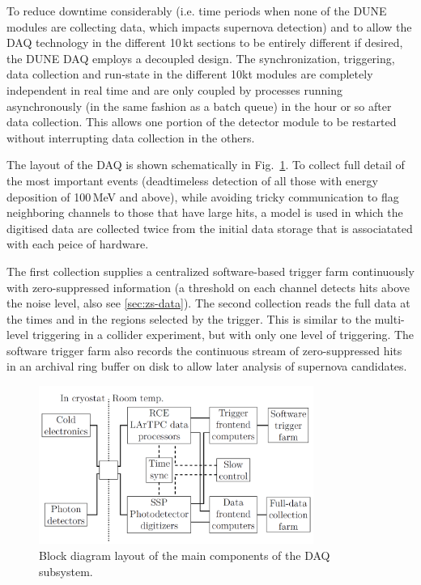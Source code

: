 To reduce downtime considerably (i.e. time periods when none of the DUNE modules are collecting data, which impacts supernova detection)
and to allow the DAQ technology in the different 10\,kt sections to be entirely different if desired, the DUNE DAQ employs a decoupled 
design. The synchronization, triggering, data collection and run-state in the different 10kt modules are completely independent in real time and
are only coupled by processes running asynchronously (in the same fashion as a batch queue) in the hour or so after data collection.
This allows one portion of the detector module to be restarted without interrupting
data collection in the others.

The layout of the DAQ is shown schematically in
Fig.~\ref{fig:fddaqblock}.  To collect full detail of the
most important events (deadtimeless detection of all those with energy
deposition of 100\,MeV and above), while avoiding tricky communication
to flag neighboring channels to those that have large hits, a model is used
in which the digitised data are collected twice from the initial data
storage that is associatated with each peice of hardware. 


The first collection supplies a centralized software-based trigger farm continuously with
zero-suppressed information (a threshold on each channel detects hits above the noise level, also see \ref{sec:zs-data}).  
The second collection reads the full data at the times and in the regions %
selected by the trigger. This is similar to the multi-level triggering in a collider experiment,
but with only one level of triggering. The software trigger farm also
records the continuous stream of zero-suppressed hits in an archival
ring buffer on disk to allow later analysis of supernova candidates.

\begin{figure}[h!]
	\centering
	\includegraphics[width=0.8\textwidth]{daq-block-diagram.png}
	\caption{Block diagram layout of the main components of the DAQ subsystem.}
	\label{fig:fddaqblock}
\end{figure}


